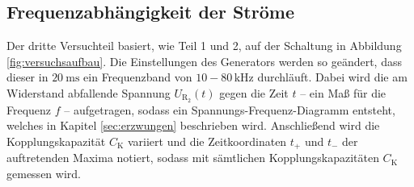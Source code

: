 \subsection{Frequenzabhängigkeit der Ströme}
\label{sec:Frequenzgenerator}
Der dritte Versuchteil basiert, wie Teil 1 und 2, auf der Schaltung in Abbildung \ref{fig:versuchsaufbau}. Die Einstellungen des Generators werden so geändert, dass dieser in $\SI{20}{\milli\second}$ ein Frequenzband von $10-80\,\si{\kilo\hertz}$ durchläuft.
Dabei wird die am Widerstand abfallende Spannung $U_\mathup{R_2}(t)$ gegen die Zeit $t$ -- ein Maß für die Frequenz $f$ -- aufgetragen, sodass ein Spannungs-Frequenz-Diagramm entsteht, welches in Kapitel \ref{sec:erzwungen} beschrieben wird.
Anschließend wird die Kopplungskapazität $C_\text{K}$ variiert und die Zeitkoordinaten $t_+$ und $t_-$ der auftretenden Maxima notiert, sodass mit sämtlichen Kopplungskapazitäten $C_\text{K}$ gemessen wird.
